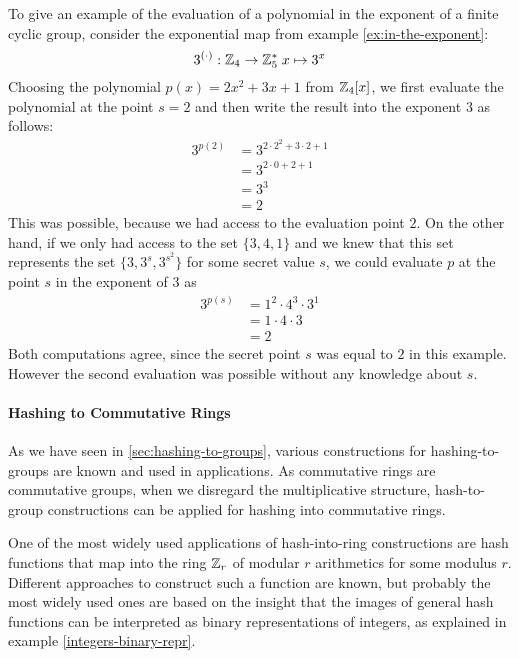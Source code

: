 \begin{example} To give an example of the evaluation of a polynomial in the exponent of a finite cyclic group, consider the exponential map from example \ref{ex:in-the-exponent}:
$$
3^{(\cdot)}: \mathbb{Z}_4 \to \mathbb{Z}_5^* \; x \mapsto 3^x
$$
Choosing the polynomial $p(x)= 2x^2 +3x +1$ from $\mathbb{Z}_4[x]$, we first evaluate the polynomial at the point $s=2$ and then write the result into the exponent $3$ as follows:
\begin{align*}
3^{p(2)} &=3^{2\cdot 2^2+3\cdot 2 +1}\\
          & = 3^{2\cdot 0 +2 +1}\\
          & = 3^{3}\\
          & = 2
\end{align*}
This was possible, because we had access to the evaluation point $2$. On the other hand, if we only had access to the set $\{3, 4, 1\}$ and we knew that this set represents the set $\{3,3^s, 3^{s^2}\}$ for some secret value $s$, we could evaluate
$p$ at the point $s$ in the exponent of $3$ as
\begin{align*}
3^{p(s)} &= 1^2 \cdot 4^3\cdot 3^1\\
         &= 1\cdot 4\cdot 3\\
         &= 2
\end{align*}
Both computations agree, since the secret point $s$ was equal to $2$ in this example. However the second evaluation was possible without any knowledge about $s$.
\end{example}
\paragraph{Hashing to Commutative Rings}
\label{hash-to-rings}
As we have seen in \ref{sec:hashing-to-groups}, various constructions for hashing-to-groups are known and used in applications. As commutative rings are commutative groups, when we disregard the multiplicative structure, hash-to-group constructions can be applied for hashing into commutative rings. 

One of the most widely used applications of hash-into-ring constructions are hash functions that map into the ring $\mathbb{Z}_r$ of modular $r$ arithmetics for some modulus $r$. Different approaches to construct such a function are known, but probably the most widely used ones are based on the insight that the images of general hash functions can be interpreted as binary representations of integers, as explained in example \ref{integers-binary-repr}.

